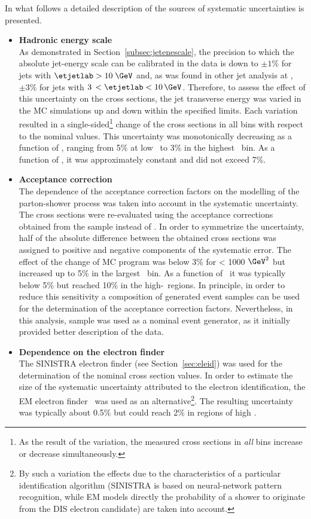 In what follows a detailed description of the sources of systematic uncertainties is presented.
\begin{itemize}
	\item \textbf{Hadronic energy scale} \\
		As demonstrated in Section~\ref{subsec:jetenescale}, the precision to which the absolute jet-energy scale can be calibrated in the data is down to $\pm1\%$ for jets with $\etjetlab > 10\;\GeV$ and, as was found in other jet analysis at \zeus, $\pm3\%$ for jets with $3\,< \etjetlab < 10\,\GeV$. Therefore, to assess the effect of this uncertainty on the cross sections, the jet transverse energy was varied in the MC simulations up and down within the specified limits. Each variation resulted in a single-sided\footnote{As the result of the variation, the measured cross sections in \textit{all} bins increase or decrease simultaneously.} change of the cross sections in all bins with respect to the nominal values. This uncertainty was monotonically decreasing as a function of \qsq, ranging from 5\% at low \qsq~to 3\% in the highest \qsq~bin. As a function of \etjetb, it was approximately constant and did not exceed 7\%.
		
	\item \textbf{Acceptance correction} \\
		The dependence of the acceptance correction factors on the modelling of the parton-shower process was taken into account in the systematic uncertainty. The cross sections were re-evaluated using the acceptance corrections obtained from the \ariadne sample instead of \lepto. In order to symmetrize the uncertainty, half of the absolute difference between the obtained cross sections was assigned to positive and negative components of the systematic error. The effect of the change of MC program was below 3\% for \qsq < 1000 $\GeV^2$ but increased up to 5\% in the largest \qsq~bin. As a function of \etjetb~it was typically below 5\% but reached 10\% in the high-\etjetb~regions.
In principle, in order to reduce this sensitivity a composition of generated event samples can be used for the determination of the acceptance correction factors. Nevertheless, in this analysis, \lepto sample was used as a nominal event generator, as it initially provided better description of the data.
			
	\item \textbf{Dependence on the electron finder}\\
		The \textsc{SINISTRA} electron finder (see Section~\ref{sec:eleid}) was used for the determination of the nominal cross section values. In order to estimate the size of the systematic uncertainty attributed to the electron identification, the \textsc{EM} electron finder~\cite{epj:c11:427,upub:Straub:url} was used as an alternative\footnote{By such a variation the effects due to the characteristics of a particular identification algorithm (SINISTRA is based on neural-network pattern recognition, while EM models directly the probability of a shower to originate from the DIS electron candidate) are taken into account.}. The resulting uncertainty was typically about 0.5\% but could reach 2\% in regions of high \qsq.
	

\end{itemize}
